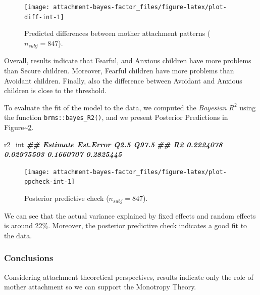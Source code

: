 \documentclass[
]{book}
\newenvironment{Shaded}{\begin{snugshade}}{\end{snugshade}}
\newcommand{\DocumentationTok}[1]{\textcolor[rgb]{0.56,0.35,0.01}{\textbf{\textit{#1}}}}
\newcommand{\NormalTok}[1]{#1}
\begin{document}
\begin{figure}

{\centering \texttt{[image: attachment-bayes-factor\_files/figure-latex/plot-diff-int-1]} 

}

\caption{Predicted differences between mother attachment patterns ($n_{subj} = 847$).}\label{fig:plot-diff-int}
\end{figure}

Overall, results indicate that Fearful, and Anxious children have more problems than Secure children. Moreover, Fearful children have more problems than Avoidant children. Finally, also the difference between Avoidant and Anxious children is close to the threshold.

To evaluate the fit of the model to the data, we computed the \emph{Bayesian} \(R^2\) using the function \texttt{brms::bayes\_R2()}, and we present Posterior Predictions in Figure\textasciitilde\ref{fig:plot-ppcheck-int}.

\begin{Shaded}
\begin{Highlighting}[]
\NormalTok{r2\_int}
\DocumentationTok{\#\#     Estimate  Est.Error      Q2.5     Q97.5}
\DocumentationTok{\#\# R2 0.2224078 0.02975503 0.1660707 0.2825445}
\end{Highlighting}
\end{Shaded}

\begin{figure}

{\centering \texttt{[image: attachment-bayes-factor\_files/figure-latex/plot-ppcheck-int-1]} 

}

\caption{Posterior predictive check ($n_{subj} = 847$).}\label{fig:plot-ppcheck-int}
\end{figure}

We can see that the actual variance explained by fixed effects and random effects is around 22\%. Moreover, the posterior predictive check indicates a good fit to the data.

\hypertarget{conclusions-5}{%
\subsubsection*{Conclusions}\label{conclusions-5}}

Considering attachment theoretical perspectives, results indicate only the role of mother attachment so we can support the Monotropy Theory.
\end{document}
